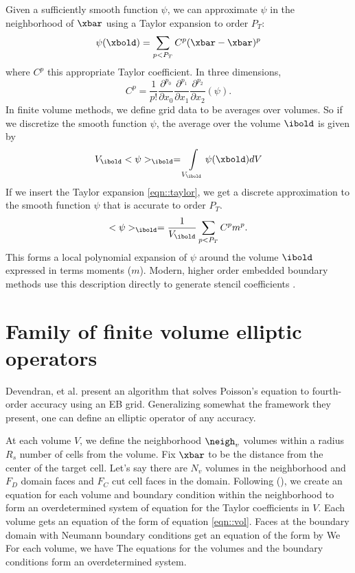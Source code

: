 \documentclass{article}
\begin{document}
Given a sufficiently smooth function $\psi$, we can approximate $\psi$
in the neighborhood of $\xbar$ using a Taylor expansion to order $P_T$:
\begin{equation}
\psi(\xbold)  =  \sum\limits_{p < P_T} C^p (\xbar -\xbar)^p
\label{eqn::taylor}
\end{equation}
where $C^p$ this appropriate Taylor coefficient.  In three dimensions,
\begin{equation}
  C^p =\frac{1}{p!}
      \frac{\partial^{p_0}}{\partial x_0}
      \frac{\partial^{p_1}}{\partial x_1}
      \frac{\partial^{p_2}}{\partial x_2}  (\psi).
\end{equation}  
In finite volume  methods, we define grid data to be
averages over volumes.   So if we discretize the smooth function
$\psi$, the average over the volume $\ibold$ is given by
\begin{equation*}
 V_\ibold <\psi>_\ibold = \int\limits_{V_\ibold} \psi(\xbold) dV
\end{equation*}
If we insert the Taylor expansion \ref{eqn::taylor}, we get a discrete
approximation to the smooth function $\psi$ that is accurate to order $P_T$.
\begin{equation*}
  <\psi>_\ibold = \frac{1}{V_\ibold} \sum\limits_{p < P_T} C^p m^p
  \label{eqn::vol}.
\end{equation*}
This forms a local polynomial expansion of $\psi$ around the volume
$\ibold$ expressed in terms moments ($m$).
Modern, higher order embedded boundary
methods use this description directly to generate stencil coefficients
\cite{Overton2022a, Devendran2017, Schwartz2015, Katz2023}.

\section{Family of finite volume elliptic operators}

Devendran, et al. \cite{Devendran2017} present an algorithm that
solves Poisson's equation to fourth-order accuracy using an EB grid.
Generalizing somewhat  the framework they present, one can define an
elliptic operator of any accuracy.

At each volume $V$, we define the neighborhood $\neigh_v$
volumes within a radius $R_s$ number of cells from the volume.
Fix $\xbar$ to be the distance from the center of the target cell.
Let's say there are
$N_v$ volumes in the neighborhood and $F_D$ domain faces and $F_C$ cut
cell faces in the domain.  Following (\cite{Devendran2017}), we create
an equation for each volume and boundary condition within the
neighborhood to form an  overdetermined system of equation for the
Taylor coefficients in $V$.    Each volume gets an equation of the
form of equation \ref{eqn::vol}.    Faces at the boundary domain with
Neumann boundary conditions get an equation of the form 
by We For each volume, we have The equations for the volumes and the
boundary conditions form an overdetermined  system.
\end{document}
